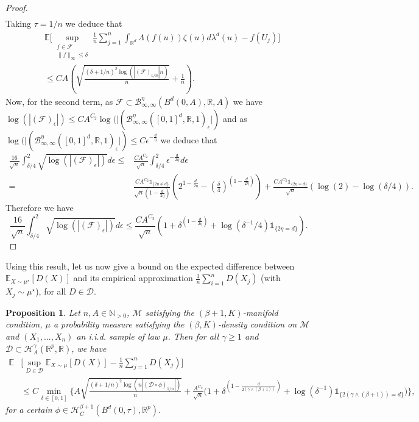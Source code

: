 \documentclass[10pt]{article}
\newtheorem{proposition}{Proposition}
\begin{document}
\begin{proof}
\begin{align*}
\end{align*}
Taking $\tau=1/n$ we deduce that
\begin{align*}
& \mathbb{E}\Big[\sup \limits_{\substack{f\in \mathcal{F} \\ \|f\|_\infty\leq \delta}}  \frac{1}{n}\sum_{j=1}^n  \int_{\mathbb{R}^d}\Lambda(f(u))\zeta(u)d\lambda^d(u)-f(U_j) \Big]\\
& \leq CA\left(\sqrt{\frac{(\delta+1/n)^2\log(|(\mathcal{F})_{1/n}|n)}{n} }+\frac{1}{n}\right).
\end{align*}
Now, for the second term, as $\mathcal{F}\subset\mathcal{B}^{ \eta}_{\infty,\infty}(B^d(0,A),\mathbb{R},A)$ we have $\log(|(\mathcal{F})_\epsilon|)\leq CA^{C_2} \log(|(\mathcal{B}^{ \eta}_{\infty,\infty}([0,1]^d,\mathbb{R},1)_\epsilon|)$ and as  $\log(|(\mathcal{B}^{ \eta}_{\infty,\infty}([0,1]^d,\mathbb{R},1)_\epsilon|)\leq C \epsilon ^{-\frac{d}{ \eta}}$ we deduce that
\begin{align*}
\frac{16}{\sqrt{n}}\int_{\delta/4}^{2}\sqrt{\log(|(\mathcal{F})_\epsilon|)}d\epsilon \leq & \frac{CA^{C_2}}{\sqrt{n}}\int_{\delta/4}^{2}\epsilon ^{-\frac{d}{2 \eta}}d\epsilon\\
 = & \frac{CA^{C_2}\mathds{1}_{\{2 \eta\neq d\}}}{\sqrt{n}(1-\frac{d}{2 \eta})}\left(2^{1-\frac{d}{2 \eta}}-\left(\frac{\delta}{4}\right)^{(1-\frac{d}{2 \eta})}\right) +\frac{CA^{C_2}\mathds{1}_{\{2 \eta= d\}}}{\sqrt{n}}(\log(2)-\log(\delta/4)).
\end{align*}
Therefore we have $$\frac{16}{\sqrt{n}}\int_{\delta/4}^2\sqrt{\log(|(\mathcal{F})_\epsilon|)}d\epsilon\leq  \frac{CA^{C_2}}{\sqrt{n}}(1+\delta^{(1-\frac{d}{2 \eta})}+\log(\delta^{-1}/4)\mathds{1}_{\{2 \eta= d\}}).$$
\end{proof}


Using this result, let us now give a bound on the expected difference between $\mathbb{E}_{X\sim \mu^\star}[D(X)]$ and its empirical approximation $\frac{1}{n}\sum \limits_{i=1}^n D(X_j)$ (with $X_j\sim \mu^\star$), for all  $D\in \mathcal{D}$.
\begin{proposition}\label{prop:statisticalerrorformu} Let $n,A\in \mathbb{N}_{>0}$, $\mathcal{M}$ satisfying the $(\beta+1,K)$-manifold condition, $\mu$ a probability measure satisfying the $(\beta,K)$-density condition on $\mathcal{M}$ and $(X_1,...,X_n)$ an i.i.d. sample of law $\mu$. Then for all $\gamma\geq 1$ and $\mathcal{D}\subset \mathcal{H}_A^\gamma(\mathbb{R}^p,\mathbb{R})$, we have
\begin{align*}
\mathbb{E}&\Big[\sup_{D\in \mathcal{D}} \mathbb{E}_{X\sim \mu}[ D(X)]-\frac{1}{n} \sum_{j=1}^n D(X_j)\Big]\\
& \leq  C \min \limits_{\delta \in [0,1]}  \Biggl\{A \sqrt{\frac{(\delta+1/n)^2\log(n|(\mathcal{D}\circ \phi)_{1/n}|)}{n}}+\frac{A^{C_2}}{\sqrt{n}}\Big(1+\delta^{(1-\frac{d}{2(\gamma\wedge(\beta+1))})}+\log(\delta^{-1})\mathds{1}_{\{2(\gamma\wedge(\beta+1))= d\}}\Big)\Biggl\},
\end{align*}
for a certain $\phi\in \mathcal{H}^{\beta+1}_C(B^d(0,\tau),\mathbb{R}^p)$.
\end{proposition}
\end{document}
